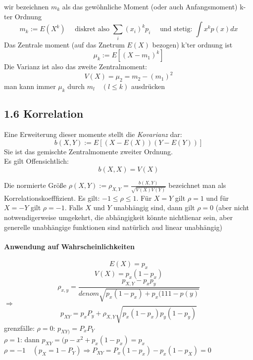 \documentclass[a4paper]{article}
\theoremstyle{definition}
\theoremstyle{remark}
\begin{document}
  wir bezeichnen $m_k$ als das gewöhnliche Moment (oder auch Anfangsmoment) k-ter Ordnung
  \begin{equation}
    m_k:= E(X^k) \quad \textrm{ diskret also } \sum_{i}(x_i)^kp_i \quad \textrm{ und stetig: } \int x^k p(x)dx
  \end{equation}
  Das Zentrale moment (auf das Znetrum $E(X)$ bezogen) k'ter ordnung ist 
  \begin{equation}
    \mu_k:= E\left[ \left( X-m_1 \right)^k \right]
  \end{equation}
Die Varianz ist also das zweite Zentralmoment:
\begin{equation}
V(X)=\mu_2=m_2-(m_1)^2
\end{equation}
man kann immer $\mu_k$ durch $m_l\quad (l\leq k)$ ausdrücken

\subsection{1.6 Korrelation}
\label{sub:1_6_korrelation}

Eine Erweiterung dieser momente stellt die \textit{Kovarianz} dar:
\begin{equation}
b(X,Y):= E\left[ \left( X-E(X) \right)\left( Y-E(Y) \right) \right]
\end{equation}
Sie ist das gemischte Zentralmomente zweiter Ordnung.\\
Es gilt Offensichtlich:
\begin{equation}
  b(X,X)=V(X)
\end{equation}

Die normierte Größe $\rho (X,Y):= \rho _{X,Y}=\frac{b(X,Y)}{\sqrt{V(X)V(Y)}}$ bezeichnet man als Korrelationskoefffizient. Es gilt:
$ -1\leq\rho \leq 1$. Für $X=Y$ gilt $\rho =1$ und für $X=-Y$ gilt $\rho =-1$. Falls $X$ und $Y$ unabhängig sind, dann gilt $\rho =0$ (aber nicht notwendigerweise umgekehrt, die abhängigkeit könnte nichtlienar sein, aber generelle unabhängige funktionen sind natürlich aud linear unabhängig)\\
\paragraph{Anwendung auf Wahrscheinlichkeiten}
\label{par:anwendung_auf_wahrscheinlichkeiten}
\begin{equation}
  E(X)=p_x
\end{equation}
\begin{equation}
  V(X)= p_x(1-p_x)
\end{equation}
 \begin{equation}
   \rho_{x,y}=\frac{p_{X,Y}-p_xp_y}{denom\sqrt{p_x(1-p_x)+p_x(111-p(y)}}
 \end{equation}
$\Rightarrow$
\begin{equation}
  p_{XY}=p_xP_y+\rho _{X,Y}\sqrt{p_x(1-p_x)p_y(1-p_y)}
\end{equation}
grenzfälle:
$\rho =0$: $ p_{XY)}=P_xP_Y$\\ 
$\rho =1$: dann $p_{XY}=(p-x^2+p_x(1-p_x)=p_x$\\
  $  \rho =-1\quad (p_X=1-P_Y) \Rightarrow P_{XY}=P_x(1-p_x)-p_x(1-p_X)=0$
\end{document}
